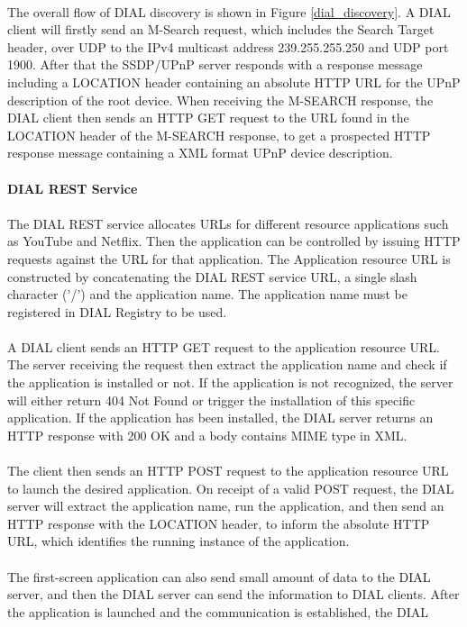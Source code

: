 \\
The overall flow of DIAL discovery is shown in Figure \ref{dial_discovery}. A
DIAL client will firstly send an M-Search request, which includes  the Search
Target header, over UDP to the IPv4 multicast address 239.255.255.250 and UDP
port 1900. After that the SSDP/UPnP server responds with a response message
including a LOCATION header containing an absolute HTTP URL for the UPnP
description of the root device. When receiving the M-SEARCH response, the DIAL
client then sends an HTTP GET request to the URL found in the LOCATION header
of the M-SEARCH response, to get a prospected HTTP response message containing
a XML format UPnP device description. \\
\\
\textbf{DIAL REST Service} \\
\\ 
The DIAL REST service allocates URLs for different resource applications such as 
YouTube and Netflix. Then the application can be controlled by issuing HTTP 
requests against the URL for that application. The Application resource URL is 
constructed by concatenating the DIAL REST service URL, a single slash character 
('/') and the application name. The application name must be registered in DIAL 
Registry to be used. \\
\\
A DIAL client sends an HTTP GET request to the application resource URL. 
The server receiving the request then extract the application name and check if the 
application is installed or not. If the application is not recognized, the 
server will either return 404 Not Found or trigger the installation of this specific 
application. If the application has been installed, the DIAL server returns 
an HTTP response with 200 OK and a body contains MIME type in XML.\\ 
\\
The client then sends an HTTP POST request to the application resource URL to 
launch the desired application. On receipt of a valid POST request, the DIAL 
server will extract the application name, run the application, and then send 
an HTTP response with the LOCATION header, to inform the absolute HTTP URL, which 
identifies the running instance of the application. \\
\\
The first-screen application can also send small amount of data to the DIAL 
server, and then the DIAL server can send the information to DIAL clients. 
After the application is launched and the communication is established, the DIAL 
